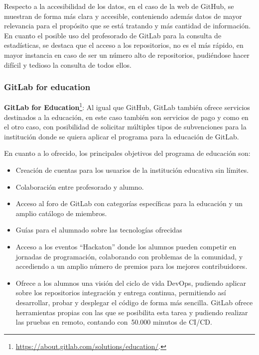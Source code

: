 Respecto a la accesibilidad de los datos, en el caso de la web de GitHub,
se muestran de forma más clara y accesible, conteniendo además datos de
mayor relevancia para el propósito que se está tratando y más cantidad de
información. En cuanto el posible uso del profesorado de GitLab para la
consulta de estadísticas, se destaca que el acceso a los repositorios, no
es el más rápido, en mayor instancia en caso de ser un número alto de
repositorios, pudiéndose hacer difícil y tedioso la consulta de todos
ellos.

\subsubsection{GitLab for education}

\textbf{GitLab for
  Education}\footnote{\url{https://about.gitlab.com/solutions/education/}.}:
Al igual que GitHub, GitLab también ofrece servicios destinados a la
educación, en este caso también son servicios de pago y como en el otro
caso, con posibilidad de solicitar múltiples tipos de subvenciones para la
institución donde se quiera aplicar el programa para la educación de
GitLab.

En cuanto a lo ofrecido, los principales objetivos del programa de
educación son:

\begin{itemize}
\item Creación de cuentas para los usuarios de la institución educativa sin
  límites.
\item Colaboración entre profesorado y alumno.
\item Acceso al foro de GitLab con categorías específicas para la educación
  y un amplio catálogo de miembros.
\item Guías para el alumnado sobre las tecnologías ofrecidas
\item Acceso a los eventos ``Hackaton'' donde los alumnos pueden competir
  en jornadas de programación, colaborando con problemas de la comunidad, y
  accediendo a un amplio número de premios para los mejores contribuidores.
\item Ofrece a los alumnos una visión del ciclo de vida DevOps, pudiendo
  aplicar sobre los repositorios integración y entrega continua,
  permitiendo así desarrollar, probar y desplegar el código de forma más
  sencilla. GitLab ofrece herramientas propias con las que se posibilita
  esta tarea y pudiendo realizar las pruebas en remoto, contando con~50.000
  minutos de CI/CD.
\end{itemize}

